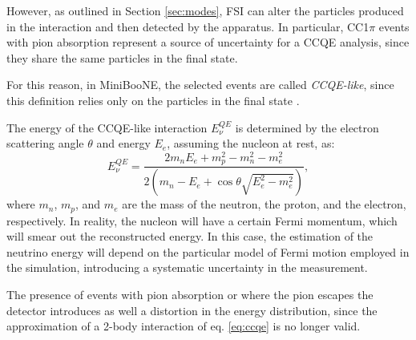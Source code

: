 However, as outlined in Section \ref{sec:modes}, FSI can alter the particles produced in the interaction and then detected by the apparatus. In particular, CC1$\pi$ events with pion absorption represent a source of uncertainty for a CCQE analysis, since they share the same particles in the final state.

For this reason, in MiniBooNE, the selected events are called \emph{CCQE-like}, since this definition relies only on the particles in the final state \cite{Katori:2013nca}. 

The energy of the CCQE-like interaction $E_{\nu}^{QE}$ is determined by the electron scattering angle $\theta$ and energy $E_e$, assuming the nucleon at rest, as:
\begin{equation}
    E_{\nu}^{QE} = \frac{2m_n E_e + m_p^2- m_n^2 - m_e^2}{2(m_n - E_e + \cos\theta\sqrt{E_e^2-m_e^2})},\label{eq:ccqe}
\end{equation}
where $m_n$, $m_p$, and $m_e$ are the mass of the neutron, the proton, and the electron, respectively. 
In reality, the nucleon will have a certain Fermi momentum, which will smear out the reconstructed energy. In this case, the estimation of the neutrino energy will depend on the particular model of Fermi motion employed in the simulation, introducing a systematic uncertainty in the measurement.

The presence of events with pion absorption or where the pion escapes the detector introduces as well a distortion in the energy distribution, since the approximation of a 2-body interaction of eq. \ref{eq:ccqe} is no longer valid.


